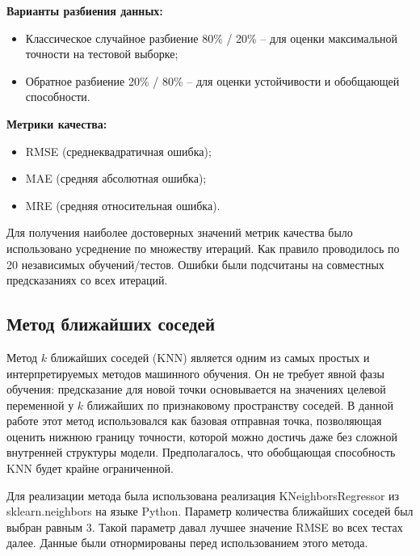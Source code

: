 \documentclass[a4paper,12pt]{article}
\begin{document}
  \begin{minipage}{\textwidth}
    \textbf{Варианты разбиения данных:}
    \begin{itemize}
      \item Классическое случайное разбиение 80\% / 20\% -- для оценки максимальной точности на тестовой выборке;
      \item Обратное разбиение 20\% / 80\% -- для оценки устойчивости и обобщающей способности.
    \end{itemize}
  \end{minipage}
  
  \begin{minipage}{\textwidth}
    \textbf{Метрики качества:}
    \begin{itemize}
      \item RMSE (среднеквадратичная ошибка);
      \item MAE (средняя абсолютная ошибка);
      \item MRE (средняя относительная ошибка).
    \end{itemize}
  \end{minipage}

  Для получения наиболее достоверных значений метрик качества было использовано усреднение по множеству итераций. Как правило проводилось по 20 независимых обучений/тестов. Ошибки были подсчитаны на совместных предсказаниях со всех итераций.

  \subsection{Метод ближайших соседей}

    Метод \(k\) ближайших соседей (KNN) является одним из самых простых и интерпретируемых методов машинного обучения. Он не требует явной фазы обучения: предсказание для новой точки основывается на значениях целевой переменной у \(k\) ближайших по признаковому пространству соседей. В данной работе этот метод использовался как базовая отправная точка, позволяющая оценить нижнюю границу точности, которой можно достичь даже без сложной внутренней структуры модели. Предполагалось, что обобщающая способность KNN будет крайне ограниченной.

    Для реализации метода была использована реализация KNeighborsRegressor из sklearn.neighbors на языке Python. Параметр количества ближайших соседей был выбран равным 3. Такой параметр давал лучшее значение RMSE во всех тестах далее. Данные были отнормированы перед использованием этого метода.
\end{document}
